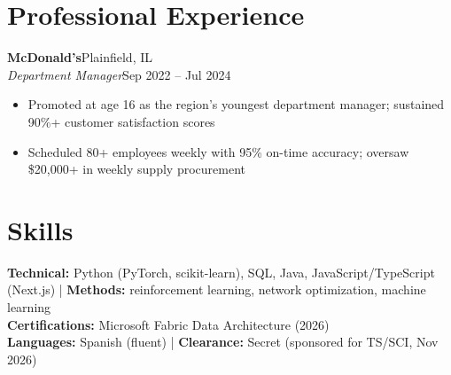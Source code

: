 \documentclass[10pt,letterpaper]{article}
\let\oldsection\section
\renewcommand{\section}{\needspace{7\baselineskip}\oldsection}
\newcommand{\entry}[4]{%
  \needspace{3\baselineskip}%
  \textbf{#1}\hfill #2\\
  \textit{#3}\hfill #4\par}
\begin{document}
\section{Professional Experience}
\entry{McDonald's}{Plainfield, IL}{Department Manager}{Sep 2022 -- Jul 2024}
\begin{itemize}
  \item Promoted at age 16 as the region's youngest department manager; sustained 90\%+ customer satisfaction scores
  \item Scheduled 80+ employees weekly with 95\% on-time accuracy; oversaw \$20,000+ in weekly supply procurement
\end{itemize}

\oldsection{Skills} %
\textbf{Technical:} Python (PyTorch, scikit-learn), SQL, Java, JavaScript/TypeScript (Next.js) \;|\; \textbf{Methods:} reinforcement learning, network optimization, machine learning \\
\textbf{Certifications:} Microsoft Fabric Data Architecture (2026) \\
\textbf{Languages:} Spanish (fluent) \;|\; \textbf{Clearance:} Secret (sponsored for TS/SCI, Nov 2026)
\end{document}
